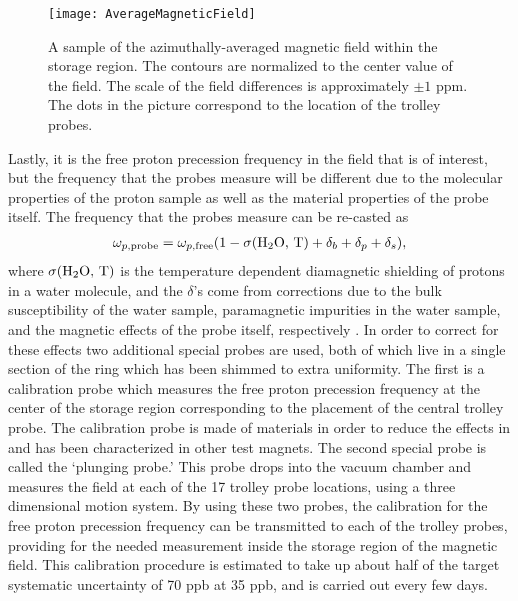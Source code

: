 \begin{figure}[]
    \centering
    \texttt{[image: AverageMagneticField]}
    \caption[Azimuthally averaged magnetic field sample]{A sample of the azimuthally-averaged magnetic field within the storage region. The contours are normalized to the center value of the field. The scale of the field differences is approximately $\pm 1$ ppm. The dots in the picture correspond to the location of the trolley probes.}
    \label{fig:AverageMagneticField}
\end{figure}


Lastly, it is the free proton precession frequency in the field that is of interest, but the frequency that the probes measure will be different due to the molecular properties of the proton sample as well as the material properties of the probe itself. The frequency that the probes measure can be re-casted as 
        \begin{align} \label{eq:wpprobe}
            \omega_{p,\text{probe}} = \omega_{p,\text{free}}(1 - \sigma(\text{H\textsubscript{2}O, T}) + \delta_{b} + \delta_{p} + \delta_{s}),
        \end{align}
where $\sigma(\text{H\textsubscript{2}O, T})$ is the temperature dependent diamagnetic shielding of protons in a water molecule, and the $\delta$'s come from corrections due to the bulk susceptibility of the water sample, paramagnetic impurities in the water sample, and the magnetic effects of the probe itself, respectively \cite{TDR}. In order to correct for these effects two additional special probes are used, both of which live in a single section of the ring which has been shimmed to extra uniformity. The first is a calibration probe which measures the free proton precession frequency at the center of the storage region corresponding to the placement of the central trolley probe. The calibration probe is made of materials in order to reduce the effects in  and has been characterized in other test magnets. The second special probe is called the `plunging probe.' This probe drops into the vacuum chamber and measures the field at each of the 17 trolley probe locations, using a three dimensional motion system. By using these two probes, the calibration for the free proton precession frequency can be transmitted to each of the trolley probes, providing for the needed measurement inside the storage region of the magnetic field. This calibration procedure is estimated to take up about half of the target systematic uncertainty of 70 ppb at 35 ppb, and is carried out every few days.



